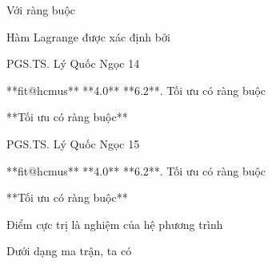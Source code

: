 Với ràng buộc


Hàm Lagrange được xác định bởi


PGS.TS. Lý Quốc Ngọc 14

**fit@hcmus** **4.0** **6.2**. Tối ưu có ràng buộc

**Tối ưu có ràng buộc**





















PGS.TS. Lý Quốc Ngọc 15

**fit@hcmus** **4.0** **6.2**. Tối ưu có ràng buộc

**Tối ưu có ràng buộc**

Điểm cực trị là nghiệm của hệ phương trình




Dưới dạng ma trận, ta có











